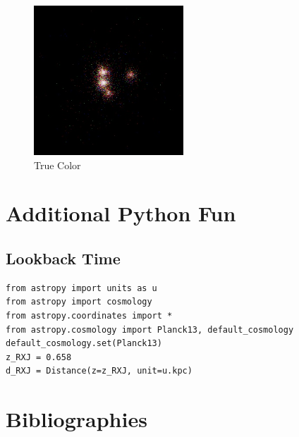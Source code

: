 \documentclass[11pt,letterpaper]{article}
\begin{document}
\begin{figure}[h]
	\centering
	\includegraphics[width=0.5\textwidth]{pictures/trueColor}
	\caption{True Color}
	\label{fig:TC}
\end{figure}





\newpage
\section{Additional Python Fun}
\subsection{Lookback Time}
\begin{lstlisting}
from astropy import units as u
from astropy import cosmology
from astropy.coordinates import *
from astropy.cosmology import Planck13, default_cosmology
default_cosmology.set(Planck13)
z_RXJ = 0.658
d_RXJ = Distance(z=z_RXJ, unit=u.kpc)
\end{lstlisting}


\newpage

\section*{Bibliographies}


\end{document}
